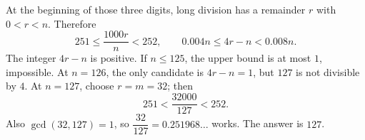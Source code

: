 At the beginning of those three digits, long division has a remainder $r$ with $0<r<n$. Therefore
\[
251\le\dfrac{1000r}{n}<252,\qquad
0.004n\le4r-n<0.008n.
\]
The integer $4r-n$ is positive. If $n\le125$, the upper bound is at most $1$, impossible. At $n=126$, the only candidate is $4r-n=1$, but $127$ is not divisible by $4$. At $n=127$, choose $r=m=32$; then
\[
251<\dfrac{32000}{127}<252.
\]
Also $\gcd(32,127)=1$, so $\dfrac{32}{127}=0.251968\ldots$ works. The answer is $\boxed{127}$.
